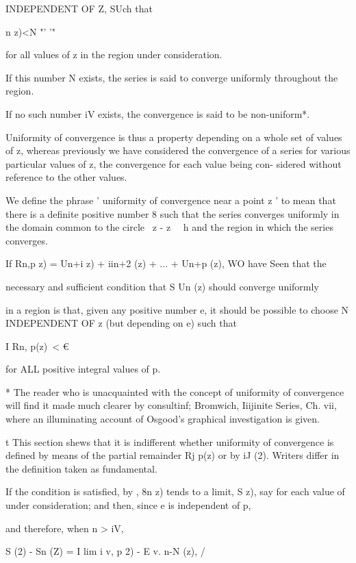 INDEPENDENT OF Z, SUch that

n z)<N "' '"

for all values of z in the region under consideration.

If this number N exists, the series is said to converge uniformly
throughout the region.

If no such number iV exists, the convergence is said to be
non-uniform*.

Uniformity of convergence is thus a property depending on a whole set
of values of z, whereas previously we have considered the convergence
of a series for various particular values of z, the convergence for
each value being con- sidered without reference to the other values.

We define the phrase ' uniformity of convergence near a point z ' to
mean that there is a definite positive number 8 such that the series
converges uniformly in the domain common to the circle \ z - z \ \ h
and the region in which the series converges.


If Rn,p z) = Un+i z) + iin+2 (z) + ... + Un+p (z), WO have Seen that
the

necessary and sufficient condition that S Un (z) should converge
uniformly

in a region is that, given any positive number e, it should be
possible to choose N INDEPENDENT OF z (but depending on e) such that

I Rn, p(z)\ < €

for ALL positive integral values of p.

* The reader who is unacquainted with the concept of uniformity of
convergence will find it made much clearer by consultinf; Bromwich,
Iiijinite Series, Ch. vii, where an illuminating account of Osgood's
graphical investigation is given.

t This section shews that it is indifferent whether uniformity of
convergence is defined by means of the partial remainder Rj p(z) or by
iJ (2). Writers differ in the definition taken as fundamental.

%
%

If the condition is satisfied, by , 8n z) tends to a limit, S
z), say for each value of under consideration; and then, since e is
independent of p,

and therefore, when n > iV,

S (2) - Sn (Z) = I lim i v, p 2) - E v. n-N (z), /

